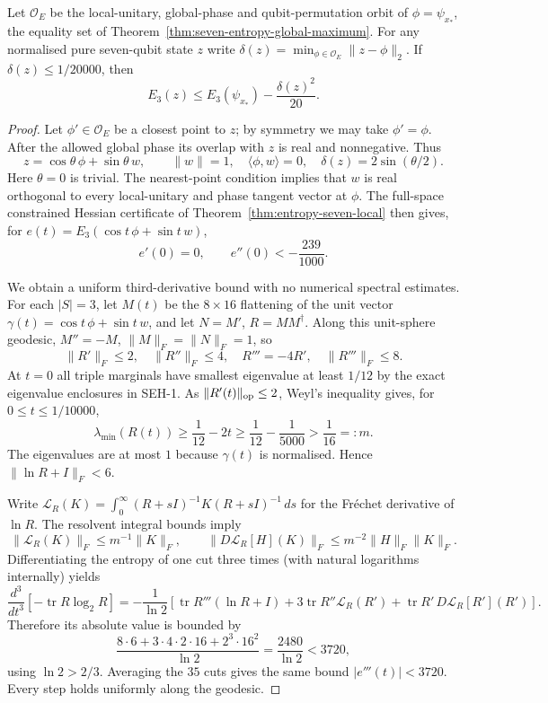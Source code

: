 \begin{theorem}
\label{thm:entropy-seven-quantbasin}
Let $\mathcal O_E$ be the local-unitary, global-phase
and qubit-permutation orbit of $\phi=\psi_{x_*}$, the equality set of
Theorem~\ref{thm:seven-entropy-global-maximum}.
For any normalised pure seven-qubit state $z$ write
$\delta(z)=\min_{\phi\in\mathcal O_E}\|z-\phi\|_2$.
If $\delta(z)\le1/20000$, then
\begin{equation}\label{eq:entropy-seven-quantbasin}
\boxed{\qquad
 E_3(z)\le E_3(\psi_{x_*})-\frac{\delta(z)^2}{20}.
 \qquad}
\end{equation}
\end{theorem}
\begin{proof}
Let $\phi'\in\mathcal O_E$ be a closest point to $z$; by symmetry we may take $\phi'=\phi$.
After the allowed global phase its overlap with $z$ is real
and nonnegative. Thus
\[
 z=\cos\theta\,\phi+\sin\theta\,w,\qquad
 \|w\|=1,\quad\langle\phi,w\rangle=0,\quad
 \delta(z)=2\sin(\theta/2).
\]
Here $\theta=0$ is trivial. The nearest-point
condition implies that $w$ is real orthogonal
to every local-unitary and phase tangent vector
at $\phi$. The full-space constrained Hessian
certificate of Theorem~\ref{thm:entropy-seven-local}
then gives, for $e(t)=E_3(\cos t\,\phi+\sin t\,w)$,
\[
 e'(0)=0,\qquad e''(0)<-\frac{239}{1000}.
\]

We obtain a uniform third-derivative bound with no
numerical spectral estimates. For each $|S|=3$,
let $M(t)$ be the $8\times16$ flattening of the
unit vector $\gamma(t)=\cos t\,\phi+\sin t\,w$,
and let $N=M'$, $R=MM^\dagger$. Along this
unit-sphere geodesic,
$M''=-M$, $\|M\|_F=\|N\|_F=1$, so
\[
 \|R'\|_F\le2,\quad \|R''\|_F\le4,\quad
 R'''=-4R',\quad\|R'''\|_F\le8.
\]
At $t=0$ all triple marginals have smallest
eigenvalue at least $1/12$ by the exact
eigenvalue enclosures in SEH-1. As
$\|R'(t)\|_{\rm op}\le2$, Weyl's inequality
gives, for $0\le t\le1/10000$,
\[
 \lambda_{\min}(R(t))
 \ge\frac1{12}-2t
 \ge\frac1{12}-\frac1{5000}
 >\frac1{16}=:m.
\]
The eigenvalues are at most $1$ because $\gamma(t)$
is normalised. Hence
$\|\ln R+I\|_F<6$.

Write
$\mathcal L_R(K)=\int_0^\infty
 (R+sI)^{-1}K(R+sI)^{-1}\,ds$
for the Fr\'echet derivative of $\ln R$.
The resolvent integral bounds imply
\[
 \|\mathcal L_R(K)\|_F\le m^{-1}\|K\|_F,\qquad
 \|D\mathcal L_R[H](K)\|_F
   \le m^{-2}\|H\|_F\|K\|_F.
\]
Differentiating the entropy of one cut three times
(with natural logarithms internally) yields
\[
 \frac{d^3}{dt^3}[-\operatorname{tr}R\log_2 R]
 =-\frac1{\ln2}
 \left[
 \operatorname{tr}R'''(\ln R+I)
 +3\operatorname{tr}R''\mathcal L_R(R')
 +\operatorname{tr}R'\,
       D\mathcal L_R[R'](R')
 \right].
\]
Therefore its absolute value is bounded by
\[
 \frac{8\cdot6+3\cdot4\cdot2\cdot16
                     +2^3\cdot16^2}{\ln2}
 =\frac{2480}{\ln2}<3720,
\]
using $\ln2>2/3$. Averaging the $35$ cuts
gives the same bound $|e'''(t)|<3720$.
Every step holds uniformly along the geodesic.


\end{proof}

